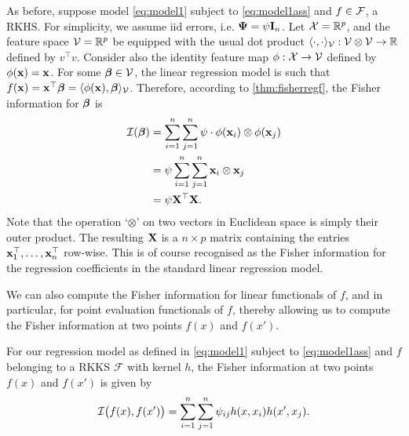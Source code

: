 \begin{example}
  As before, suppose model \cref{eq:model1} subject to \cref{eq:model1ass} and $f\in{\mathcal F}$, a RKHS.
  For simplicity, we assume iid errors, i.e. ${\bm\Psi} = \psi {\mathbf I}_n$.
  Let ${\mathcal X} = \mathbb{R}^p$, and the feature space ${\mathcal V} = \mathbb{R}^p$ be equipped with the usual dot product $\langle\cdot,\cdot\rangle_{\mathcal V}:{\mathcal V} \otimes {\mathcal V} \to \mathbb{R}$ defined by $v^\top v$.
  Consider also the identity feature map $\phi:{\mathcal X} \to {\mathcal V}$ defined by $\phi({\mathbf x})={\mathbf x}$.
  For some $\boldsymbol\beta \in {\mathcal V}$, the linear regression model is such that $f({\mathbf x}) = {\mathbf x}^\top \boldsymbol\beta = \langle\phi({\mathbf x}),\boldsymbol\beta\rangle_{\mathcal V}$.
  Therefore, according to \cref{thm:fisherregf}, the Fisher information for ${\bm\beta}$ is
  \begin{align*}
    {\mathcal I}(\boldsymbol\beta) 
    &= \sum_{i=1}^n\sum_{j=1}^n \psi \cdot \phi({\mathbf x}_i) \otimes \phi({\mathbf x}_j) \\
    &= \psi \sum_{i=1}^n\sum_{j=1}^n {\mathbf x}_i \otimes {\mathbf x}_j \\
    &= \psi {\mathbf X}^\top {\mathbf X}.
  \end{align*}
  Note that the operation `$\otimes$' on two vectors in Euclidean space is simply their outer product.
  The resulting ${\mathbf X}$ is a $n \times p$ matrix containing the entries ${\mathbf x}_1^\top,\dots,{\mathbf x}_n^\top$ row-wise.
  This is of course recognised as the Fisher information for the regression coefficients in the standard linear regression model.
\end{example}

We can also compute the Fisher information for linear functionals of $f$, and in particular, for point evaluation functionals of $f$, thereby allowing us to compute the Fisher information at two points $f(x)$ and $f(x')$.

\begin{corollary}\label{thm:fisherreglinfunc}
	For our regression model as defined in \cref{eq:model1} subject to \cref{eq:model1ass} and $f$ belonging to a RKKS $\mathcal F$ with kernel $h$, the Fisher information at two points $f(x)$ and $f(x')$
	is given by
	\[
		{\mathcal I}\big(f(x),f(x')\big) = \sum_{i=1}^n\sum_{j=1}^n \psi_{ij} h(x,x_i)h(x',x_j).
	\]
\end{corollary}

